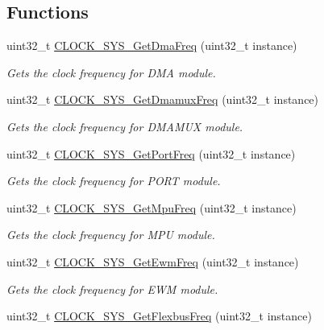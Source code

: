 \subsection*{Functions}
\begin{DoxyCompactItemize}
\item 
uint32\+\_\+t \hyperlink{group__clock__manager_gaf5d54e29e1eac3b3c36016261d715b56}{C\+L\+O\+C\+K\+\_\+\+S\+Y\+S\+\_\+\+Get\+Dma\+Freq} (uint32\+\_\+t instance)
\begin{DoxyCompactList}\small\item\em Gets the clock frequency for D\+MA module. \end{DoxyCompactList}\item 
uint32\+\_\+t \hyperlink{group__clock__manager_ga05595e5d1dbd04e42f9113f24ae3c6f0}{C\+L\+O\+C\+K\+\_\+\+S\+Y\+S\+\_\+\+Get\+Dmamux\+Freq} (uint32\+\_\+t instance)
\begin{DoxyCompactList}\small\item\em Gets the clock frequency for D\+M\+A\+M\+UX module. \end{DoxyCompactList}\item 
uint32\+\_\+t \hyperlink{group__clock__manager_ga47d36f9499d6deba1f0b88759c144845}{C\+L\+O\+C\+K\+\_\+\+S\+Y\+S\+\_\+\+Get\+Port\+Freq} (uint32\+\_\+t instance)
\begin{DoxyCompactList}\small\item\em Gets the clock frequency for P\+O\+RT module. \end{DoxyCompactList}\item 
uint32\+\_\+t \hyperlink{group__clock__manager_gafedf5158800399e493c9514d64e44f7e}{C\+L\+O\+C\+K\+\_\+\+S\+Y\+S\+\_\+\+Get\+Mpu\+Freq} (uint32\+\_\+t instance)
\begin{DoxyCompactList}\small\item\em Gets the clock frequency for M\+PU module. \end{DoxyCompactList}\item 
uint32\+\_\+t \hyperlink{group__clock__manager_gaa9683d6fe0368cc25a40d3a707e0e07c}{C\+L\+O\+C\+K\+\_\+\+S\+Y\+S\+\_\+\+Get\+Ewm\+Freq} (uint32\+\_\+t instance)
\begin{DoxyCompactList}\small\item\em Gets the clock frequency for E\+WM module. \end{DoxyCompactList}\item 
uint32\+\_\+t \hyperlink{group__clock__manager_gaa023aff0f2ce4a306bc91ff540bf2564}{C\+L\+O\+C\+K\+\_\+\+S\+Y\+S\+\_\+\+Get\+Flexbus\+Freq} (uint32\+\_\+t instance)

\end{DoxyCompactItemize}
